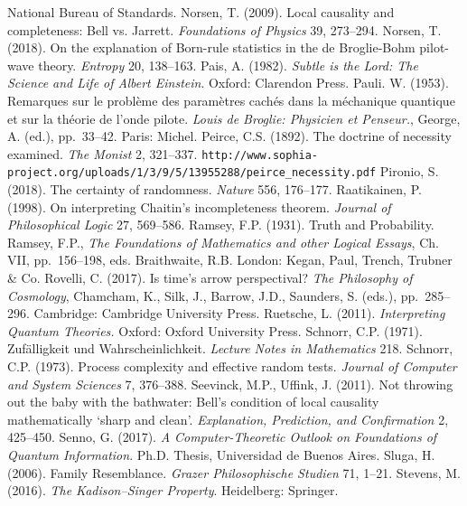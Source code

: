 \documentclass[12pt]{article}
\numberwithin{equation}{section}
\begin{document}
\begin{thebibliography}{99}
National Bureau of Standards.
\bibitem{}
 Norsen, T. (2009). Local causality and completeness: Bell vs. Jarrett. \emph{ Foundations of Physics} 39, 273--294.
          \bibitem{} Norsen, T. (2018). On the explanation of Born-rule statistics in the de Broglie-Bohm pilot-wave theory.
          \emph{Entropy} 20, 138--163. 
\bibitem{} Pais, A. (1982). \emph{Subtle is the Lord: The Science and Life of Albert Einstein}. Oxford: Clarendon Press.
\bibitem{} Pauli. W. (1953). Remarques sur le probl\`{e}me des param\`{e}tres cach\'{e}s dans la m\'{e}chanique quantique et sur la th\'{e}orie de l'onde pilote.
\emph{Louis de Broglie: Physicien et Penseur.}, 
George, A. (ed.), pp.\ 33--42.  Paris: Michel. 
\bibitem{} Peirce, C.S. (1892). The doctrine of necessity examined. \emph{The Monist} 2,  321--337.
\verb#http://www.sophia-project.org/uploads/1/3/9/5/13955288/peirce_necessity.pdf#
   \bibitem{}  Pironio, S. (2018). The certainty of randomness. \emph{Nature} 556, 176--177.  
    \bibitem{}    Raatikainen, P. (1998). On interpreting Chaitin's incompleteness theorem. \emph{Journal of Philosophical Logic} 27, 569--586.
   \bibitem{}  Ramsey, F.P.   (1931).  Truth  and  Probability.  Ramsey, F.P.,  \emph{The  Foundations  of   Mathematics  and  other  Logical  Essays},  Ch.  VII,  pp.\ 156--198,  eds.  Braithwaite, R.B.  London: Kegan, Paul, Trench, Trubner \& Co.
     \bibitem{} Rovelli, C. (2017). Is time's arrow perspectival? 
     \emph{The Philosophy of Cosmology}, Chamcham, K., Silk, J., Barrow, J.D., Saunders, S. (eds.),  
     pp.\ 285--296. Cambridge: Cambridge University Press.
  \bibitem{}   Ruetsche, L. (2011). \emph{Interpreting Quantum Theories.} Oxford: Oxford University Press.    
    \bibitem{}  Schnorr, C.P. (1971). {Zuf\"{a}lligkeit und Wahrscheinlichkeit}. \emph{Lecture Notes in Mathematics} 218. 
        \bibitem{}  Schnorr, C.P. (1973). Process complexity and effective random tests. \emph{Journal of Computer and System Sciences} 7, 376--388.
         \bibitem{}
Seevinck, M.P.,  Uffink, J. (2011). Not throwing out the baby with the bathwater: Bell's condition of local causality mathematically `sharp and clean'. \emph{Explanation, Prediction, and Confirmation}  2, 425--450.
        \bibitem{} Senno, G. (2017). \emph{A Computer-Theoretic Outlook on Foundations of Quantum Information}.
      Ph.D. Thesis, Universidad de Buenos Aires.  
    \bibitem{} Sluga, H. (2006). Family Resemblance. \emph{Grazer Philosophische Studien} 71, 1--21.  
  \bibitem{}Stevens, M. (2016). \emph{The Kadison--Singer Property}. Heidelberg: Springer.   

\end{thebibliography}
\end{document}
